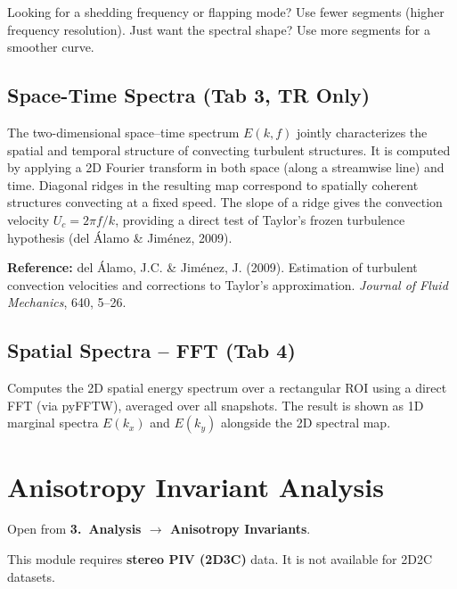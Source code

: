 \documentclass[11pt, a4paper]{report}
\newcommand{\uipth}[1]{\textbf{\textcolor{upblue}{#1}}}
\begin{document}
\begin{tipbox}
Looking for a shedding frequency or flapping mode? Use fewer segments (higher frequency resolution). Just want the spectral shape? Use more segments for a smoother curve.
\end{tipbox}

\section{Space-Time Spectra (Tab 3, TR Only)}

The two-dimensional space--time spectrum $E(k, f)$ jointly characterizes the spatial and temporal structure of convecting turbulent structures. It is computed by applying a 2D Fourier transform in both space (along a streamwise line) and time. Diagonal ridges in the resulting map correspond to spatially coherent structures convecting at a fixed speed. The slope of a ridge gives the convection velocity $U_c = 2\pi f / k$, providing a direct test of Taylor's frozen turbulence hypothesis (del \'{A}lamo \& Jim\'{e}nez, 2009).

\noindent\textbf{Reference:} del \'{A}lamo, J.C. \& Jim\'{e}nez, J. (2009). Estimation of turbulent convection velocities and corrections to Taylor's approximation. \textit{Journal of Fluid Mechanics}, 640, 5--26.

\section{Spatial Spectra -- FFT (Tab 4)}

Computes the 2D spatial energy spectrum over a rectangular ROI using a direct FFT (via pyFFTW), averaged over all snapshots. The result is shown as 1D marginal spectra $E(k_x)$ and $E(k_y)$ alongside the 2D spectral map.

\chapter{Anisotropy Invariant Analysis}
\label{ch:anisotropy}

Open from \uipth{3.\ Analysis $\to$ Anisotropy Invariants}.

\begin{notebox}
This module requires \textbf{stereo PIV (2D3C)} data. It is not available for 2D2C datasets.
\end{notebox}
\end{document}
